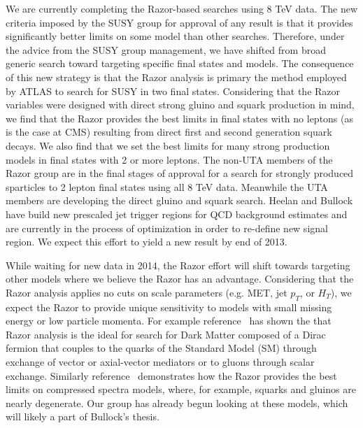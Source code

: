  We are currently completing the 
Razor-based searches using 8 TeV data.
The new criteria imposed by the SUSY group for approval of any result
is that it provides significantly better limits on some model than
other searches.  Therefore, under the advice from the SUSY group
management, we have shifted from broad generic search toward targeting
specific final states and models. The consequence of this new strategy
is that the Razor analysis is primary the method employed by ATLAS to
search for SUSY in two final states. Considering that the Razor
variables were designed with direct strong gluino and squark
production in mind, we find that the Razor provides the best limits in
final states with no leptons (as is the case at CMS) resulting from
direct first and second generation squark decays. We also find that we
set the best limits for many strong production models in final states
with 2 or more leptons. The non-UTA members of the Razor group are in
the final stages of approval for a search for strongly produced
sparticles to 2 lepton final states using all 8 TeV data. Meanwhile
the UTA members are developing the direct gluino and squark
search. Heelan and Bullock have build new prescaled jet trigger
regions for QCD background estimates and are currently in the process
of optimization in order to re-define new signal region. We expect
this effort to yield a new result by end of 2013.

While waiting for new data in 2014, the Razor effort will shift towards
targeting other models where we believe the Razor has an advantage.
Considering that the Razor analysis applies no cuts on scale
parameters (e.g. MET, jet $p_T$, or $H_T$), we expect the Razor to
provide unique sensitivity to models with small missing energy or low
particle momenta. For example reference~\cite{RazorDarkMatter} has
shown the that Razor analysis is the ideal for search for Dark Matter
composed of a Dirac fermion that couples to the quarks of the Standard
Model (SM) through exchange of vector or axial-vector mediators or to
gluons through scalar exchange. Similarly
reference~\cite{RazorCompressed} demonstrates how the Razor provides
the best limits on compressed spectra models, where, for example,
squarks and gluinos are nearly degenerate. Our group has already begun
looking at these models, which will likely a part of Bullock's
thesis.


